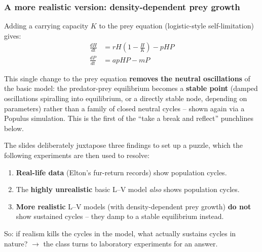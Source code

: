 \documentclass[11pt,a4paper]{article}
\begin{document}
\subsubsection*{A more realistic version: density-dependent prey growth}
Adding a carrying capacity $K$ to the prey equation (logistic-style self-limitation) gives:
\begin{align*}
\frac{dH}{dt} &= rH\left(1-\frac{H}{K}\right) - pHP \\
\frac{dP}{dt} &= apHP - mP
\end{align*}
\begin{keybox}[title=Effect of adding density dependence]
This single change to the prey equation \textbf{removes the neutral oscillations} of the basic model: the predator-prey equilibrium becomes a \textbf{stable point} (damped oscillations spiralling into equilibrium, or a directly stable node, depending on parameters) rather than a family of closed neutral cycles -- shown again via a Populus simulation. This is the first of the ``take a break and reflect'' punchlines below.
\end{keybox}

\begin{exambox}[title={``Take a break and reflect'': the three-part paradox}]
The slides deliberately juxtapose three findings to set up a puzzle, which the following experiments are then used to resolve:
\begin{enumerate}[leftmargin=*]
\item \textbf{Real-life data} (Elton's fur-return records) show population cycles.
\item The \textbf{highly unrealistic} basic L--V model \emph{also} shows population cycles.
\item \textbf{More realistic} L--V models (with density-dependent prey growth) \textbf{do not} show sustained cycles -- they damp to a stable equilibrium instead.
\end{enumerate}
So: if realism kills the cycles in the model, what actually sustains cycles in nature? $\to$ the class turns to laboratory experiments for an answer.
\end{exambox}
\end{document}
